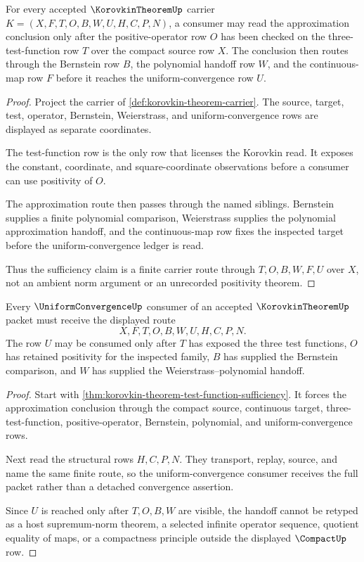 \begin{theorem}
\label{thm:korovkin-theorem-test-function-sufficiency}
For every accepted $\KorovkinTheoremUp$ carrier $K=(X,F,T,O,B,W,U,H,C,P,N)$, a consumer may read the approximation conclusion only after the positive-operator row $O$ has been checked on the three-test-function row $T$ over the compact source row $X$. The conclusion then routes through the Bernstein row $B$, the polynomial handoff row $W$, and the continuous-map row $F$ before it reaches the uniform-convergence row $U$.
\end{theorem}
\begin{proof}
Project the carrier of \autoref{def:korovkin-theorem-carrier}. The source, target, test, operator, Bernstein, Weierstrass, and uniform-convergence rows are displayed as separate coordinates.

The test-function row is the only row that licenses the Korovkin read. It exposes the constant, coordinate, and square-coordinate observations before a consumer can use positivity of $O$.

The approximation route then passes through the named siblings. Bernstein supplies a finite polynomial comparison, Weierstrass supplies the polynomial approximation handoff, and the continuous-map row fixes the inspected target before the uniform-convergence ledger is read.

Thus the sufficiency claim is a finite carrier route through $T,O,B,W,F,U$ over $X$, not an ambient norm argument or an unrecorded positivity theorem.
\end{proof}

\begin{theorem}
\label{thm:korovkin-theorem-uniform-convergence-handoff}
Every $\UniformConvergenceUp$ consumer of an accepted $\KorovkinTheoremUp$ packet must receive the displayed route
$$
X,F,T,O,B,W,U,H,C,P,N .
$$
The row $U$ may be consumed only after $T$ has exposed the three test functions, $O$ has retained positivity for the inspected family, $B$ has supplied the Bernstein comparison, and $W$ has supplied the Weierstrass--polynomial handoff.
\end{theorem}
\begin{proof}
Start with \autoref{thm:korovkin-theorem-test-function-sufficiency}. It forces the approximation conclusion through the compact source, continuous target, three-test-function, positive-operator, Bernstein, polynomial, and uniform-convergence rows.

Next read the structural rows $H,C,P,N$. They transport, replay, source, and name the same finite route, so the uniform-convergence consumer receives the full packet rather than a detached convergence assertion.

Since $U$ is reached only after $T,O,B,W$ are visible, the handoff cannot be retyped as a host supremum-norm theorem, a selected infinite operator sequence, quotient equality of maps, or a compactness principle outside the displayed $\CompactUp$ row.
\end{proof}


